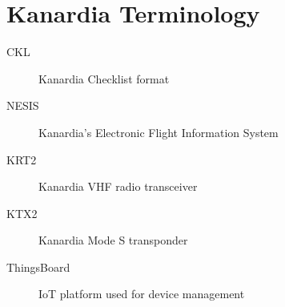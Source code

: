 \section{Kanardia Terminology}

\begin{description}
    \item[CKL] Kanardia Checklist format
    \item[NESIS] Kanardia's Electronic Flight Information System
    \item[KRT2] Kanardia VHF radio transceiver
    \item[KTX2] Kanardia Mode S transponder
    \item[ThingsBoard] IoT platform used for device management
\end{description}
